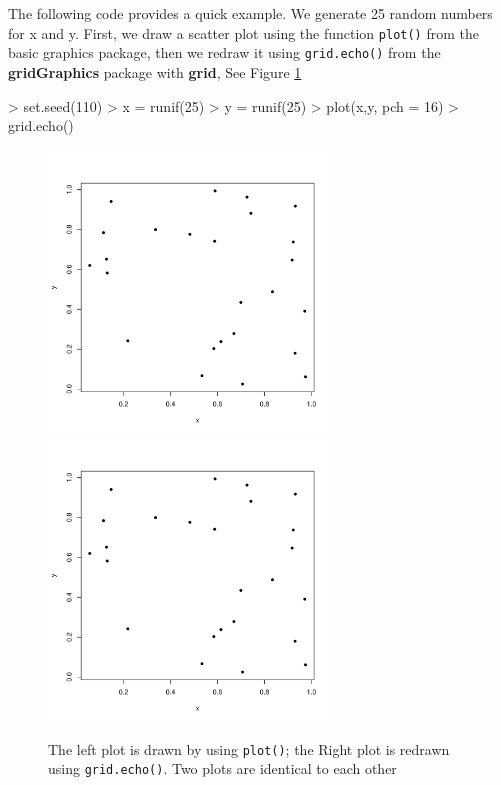 \documentclass[paper=a4, fontsize=11pt]{report}
\begin{document}
The following code provides a quick example. We generate 25 random numbers for x and y. First, we draw a scatter plot using the function \texttt{plot()} from the basic graphics package, then we redraw it using \texttt{grid.echo()} from the \textbf{gridGraphics} package with \textbf{grid}, See Figure \ref{figure_1.1}
\begin{Schunk}
\begin{Sinput}
> set.seed(110)
> x = runif(25)
> y = runif(25)
> plot(x,y, pch = 16)
> grid.echo()
\end{Sinput}
\end{Schunk}

\begin{figure}[h]
	\begin{center}
		\includegraphics[height = 7.5cm, width = 7.5cm]{figure/report_basic_demo_1.pdf}
		\includegraphics[height = 7.5cm, width = 7.5cm]{figure/report_basic_demo_1.pdf}
		\caption{The left plot is drawn by using \texttt{plot()}; the Right plot is redrawn using \texttt{grid.echo()}. Two plots are identical to each other}
		\label{figure_1.1}
	\end{center}
\end{figure}
\end{document}
